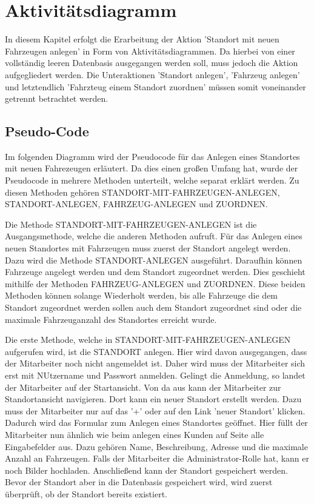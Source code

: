 \chapter{Aktivitätsdiagramm}

In diesem Kapitel erfolgt die Erarbeitung der Aktion 'Standort mit neuen Fahrzeugen anlegen' in Form von Aktivitätsdiagrammen. Da hierbei von einer vollständig leeren Datenbasis ausgegangen werden soll, muss jedoch die Aktion aufgegliedert werden. Die Unteraktionen 'Standort anlegen', 'Fahrzeug anlegen' und letztendlich 'Fahrzteug einem Standort zuordnen' müssen somit voneinander getrennt betrachtet werden. 

\section{Pseudo-Code}
Im folgenden Diagramm wird der Pseudocode für das Anlegen eines Standortes mit neuen Fahrezeugen erläutert. Da dies einen großen Umfang hat, wurde der Pseudocode in mehrere Methoden unterteilt, welche separat erklärt werden. Zu diesen Methoden gehören STANDORT-MIT-FAHRZEUGEN-ANLEGEN, STANDORT-ANLEGEN, FAHRZEUG-ANLEGEN und ZUORDNEN.

Die Methode STANDORT-MIT-FAHRZEUGEN-ANLEGEN ist die Ausgangsmethode, welche die anderen Methoden aufruft. Für das Anlegen eines neuen Standortes mit Fahrzeugen muss zuerst der Standort angelegt werden. Dazu wird die Methode STANDORT-ANLEGEN ausgeführt. Daraufhin können Fahrzeuge angelegt werden und dem Standort zugeordnet werden. Dies geschieht mithilfe der Methoden FAHRZEUG-ANLEGEN und ZUORDNEN. Diese beiden Methoden können solange Wiederholt werden, bis alle Fahrzeuge die dem Standort zugeordnet werden sollen auch dem Standort zugeordnet sind oder die maximale Fahrzeuganzahl des Standortes erreicht wurde.


Die erste Methode, welche in STANDORT-MIT-FAHRZEUGEN-ANLEGEN aufgerufen wird, ist die STANDORT anlegen. Hier wird davon ausgegangen, dass der Mitarbeiter noch nicht angemeldet ist. Daher wird muss der Mitarbeiter sich erst mit NUtzername und Passwort anmelden. Gelingt die Anmeldung, so landet der Mitarbeiter auf der Startansicht. Von da aus kann der Mitarbeiter zur Standortansicht navigieren. Dort kann ein neuer Standort erstellt werden. Dazu muss der Mitarbeiter nur auf das '+' oder auf den Link 'neuer Standort' klicken. Dadurch wird das Formular zum Anlegen eines Standortes geöffnet. Hier füllt der Mitarbeiter nun ähnlich wie beim anlegen eines Kunden auf Seite
\pageref{code:KundeAnlegen} alle Eingabefelder aus. Dazu gehören Name, Beschreibung, Adresse und die maximale Anzahl an Fahrzeugen. Falls der Mitarbeiter die Administrator-Rolle hat, kann er noch Bilder hochladen. Anschließend kann der Standort gespeichert werden. Bevor der Standort aber in die Datenbasis gespeichert wird, wird zuerst überprüft, ob der Standort bereits existiert.\label{code:StandortAnlegen}

